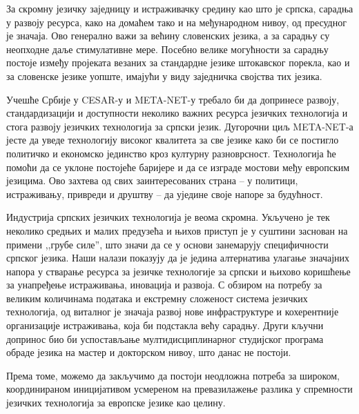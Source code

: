 \begin{multicols}{2}
За скромну језичку заједницу и истраживачку средину као што је српска, сарадња у развоју ресурса, како на домаћем тако и на међународном нивоу,  од пресудног је значаја. Ово генерално  важи за већину словенских језика, а за сарадњу су неопходне даље стимулативне мере. Посебно велике могућности за сарадњу постоје између пројеката везаних за стандардне језике штокавског порекла, као и за словенске језике уопште, имајући у виду заједничка својства тих језика. 

Учешће Србије у CESAR-у и META-NET-у требало би да допринесе развоју, стандардизацији и доступности неколико важних ресурса језичких технологија и стога развоју језичких технологија за српски језик. Дугорочни циљ META-NET-а јесте да уведе технологију високог квалитета за све језике како би се постигло политичко и економско јединство кроз културну разноврсност. Технологија ће помоћи да се уклоне постојеће баријере и да се изграде мостови међу европским језицима. Ово захтева од свих заинтересованих страна – у политици, истраживању, привреди и друштву – да уједине своје напоре за будућност. 

Индустрија српских језичких технологија је веома скромна. Укључено је тек неколико средњих и малих предузећа и њихов приступ је у суштини заснован на примени ,,грубе силе'', што значи да се у основи занемарују специфичности српског језика. Наши налази показују да је једина алтернатива улагање значајних напора у стварање ресурса за језичке технологије за српски и њихово коришћење за унапређење истраживања, иновација и развоја. С обзиром на потребу за великим количинама података и екстремну сложеност система језичких технологија, од виталног је значаја развој нове инфраструктуре и кохерентније организације истраживања, која би подстакла већу сарадњу. Други кључни допринос био би успостављање мул\-ти\-дис\-ци\-пли\-нар\-ног студијског програма обраде језика на мастер и докторском нивоу, што данас не постоји.

Према томе, можемо да закључимо да постоји неодложна потреба за широком, координираном иницијативом усмереном на превазилажење разлика у спремности језичких технологија за европске језике као целину. 



\end{multicols}
